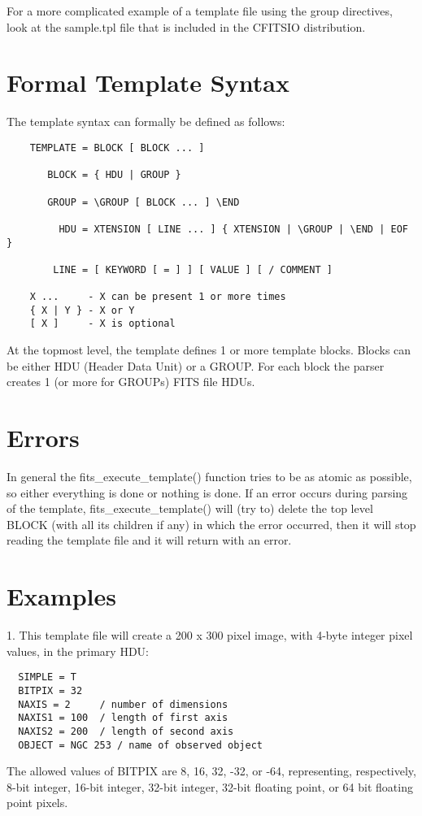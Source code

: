 \documentclass[11pt]{book}
\begin{document}
For a more complicated example of a template file using the group directives,
look at the sample.tpl file that is included in the CFITSIO distribution.


\section{Formal Template Syntax}

The template syntax can formally be defined as follows:

\begin{verbatim}
    TEMPLATE = BLOCK [ BLOCK ... ]

       BLOCK = { HDU | GROUP }

       GROUP = \GROUP [ BLOCK ... ] \END

         HDU = XTENSION [ LINE ... ] { XTENSION | \GROUP | \END | EOF }

        LINE = [ KEYWORD [ = ] ] [ VALUE ] [ / COMMENT ]

    X ...     - X can be present 1 or more times
    { X | Y } - X or Y
    [ X ]     - X is optional
\end{verbatim}

At the topmost level, the template defines 1 or more template blocks. Blocks
can be either HDU (Header Data Unit) or a GROUP. For each block the parser
creates 1 (or more for GROUPs) FITS file HDUs.



\section{Errors}

In general the fits\_execute\_template() function tries to be as atomic
as possible, so either everything is done or nothing is done. If an
error occurs during parsing of the template, fits\_execute\_template()
will (try to) delete the top level BLOCK (with all its children if any)
in which the error occurred, then it will stop reading the template file
and it will return with an error.


\section{Examples}

1. This template file will create a 200 x 300 pixel image, with 4-byte
integer pixel values, in the primary HDU:

\begin{verbatim}
  SIMPLE = T
  BITPIX = 32
  NAXIS = 2     / number of dimensions
  NAXIS1 = 100  / length of first axis
  NAXIS2 = 200  / length of second axis
  OBJECT = NGC 253 / name of observed object
\end{verbatim}
The allowed values of BITPIX are 8, 16, 32, -32, or -64,
representing, respectively, 8-bit integer, 16-bit integer, 32-bit
integer, 32-bit floating point, or 64 bit floating point pixels.
\end{document}
